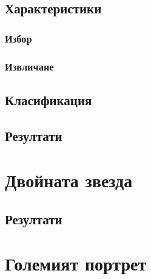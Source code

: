 \documentclass[12pt]{report}
\numberwithin{equation}{section}
\numberwithin{figure}{section}
\begin{document}
    \section{Характеристики}
        \subsection{Избор}
        \subsection{Извличане}
    \section{Класификация}    
    \section{Резултати}
\chapter{Двойната звезда}
    \section{Резултати}
\chapter{Големият портрет}
\end{document}
